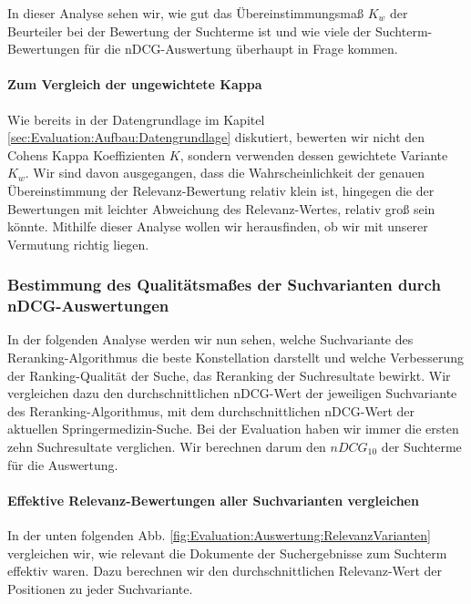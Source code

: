 In dieser Analyse sehen wir, wie gut das Übereinstimmungsmaß $K_w$ der Beurteiler bei der Bewertung der Suchterme ist und wie viele der Suchterm-Bewertungen für die nDCG-Auswertung überhaupt in Frage kommen. 



\paragraph{Zum Vergleich der ungewichtete Kappa}
Wie bereits in der Datengrundlage im Kapitel \ref{sec:Evaluation:Aufbau:Datengrundlage} diskutiert, bewerten wir nicht den Cohens Kappa Koeffizienten $K$, sondern verwenden dessen gewichtete Variante $K_w$. Wir sind davon ausgegangen, dass die Wahrscheinlichkeit der genauen Übereinstimmung der Relevanz-Bewertung relativ klein ist, hingegen die der Bewertungen mit leichter Abweichung des Relevanz-Wertes, relativ groß sein könnte. Mithilfe dieser Analyse wollen wir herausfinden, ob wir mit unserer Vermutung richtig liegen.



\subsubsection{Bestimmung des Qualitätsmaßes der Suchvarianten durch nDCG-Auswertungen}
\label{sec:Evaluation:Auswertung:QuantitativeAuswertung:nDCG}

In der folgenden Analyse werden wir nun sehen, welche Suchvariante des Reranking-Algorithmus die beste Konstellation darstellt und welche Verbesserung der Ranking-Qualität der Suche, das Reranking der Suchresultate bewirkt. Wir vergleichen dazu den durchschnittlichen nDCG-Wert der jeweiligen Suchvariante des Reranking-Algorithmus, mit dem durchschnittlichen nDCG-Wert der aktuellen Springermedizin-Suche. Bei der Evaluation haben wir immer die ersten zehn Suchresultate verglichen. Wir berechnen darum den $nDCG_{10}$ der Suchterme für die Auswertung.



\paragraph{Effektive Relevanz-Bewertungen aller Suchvarianten vergleichen}
In der unten folgenden Abb. \ref{fig:Evaluation:Auswertung:RelevanzVarianten} vergleichen wir, wie relevant die Dokumente der Suchergebnisse zum Suchterm effektiv waren. Dazu berechnen wir den durchschnittlichen Relevanz-Wert der Positionen zu jeder Suchvariante.

